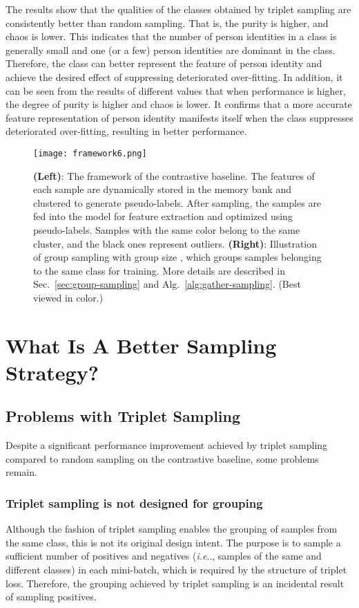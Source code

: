 \documentclass[lettersize,journal]{IEEEtran}
\makeatletter
\DeclareRobustCommand\onedot{\futurelet\@let@token\@onedot}
\def\@onedot{\ifx\@let@token.\else.\null\fi\xspace}
\def\ie{\emph{i.e}\onedot} \def\Ie{\emph{I.e}\onedot}
\makeatother
\begin{document}
The results show that the qualities of the classes obtained by triplet sampling are consistently better than random sampling. That is, the purity is higher, and chaos is lower. This indicates that the number of person identities in a class is generally small and one (or a few) person identities are dominant in the class. Therefore, the class can better represent the feature of person identity and achieve the desired effect of suppressing deteriorated over-fitting. In addition, it can be seen from the results of different  values that when performance is higher, the degree of purity is higher and chaos is lower. It confirms that a more accurate feature representation of person identity manifests itself when the class suppresses deteriorated over-fitting, resulting in better performance.

\begin{figure*}[t]
\begin{center}
\texttt{[image: framework6.png]}
\end{center}
\caption{\textbf{(Left)}: The framework of the contrastive baseline. The features of each sample are dynamically stored in the memory bank and clustered to generate pseudo-labels. After sampling, the samples are fed into the model for feature extraction and optimized using pseudo-labels. Samples with the same color belong to the same cluster, and the black ones represent outliers.
\textbf{(Right)}: Illustration of group sampling with group size , which groups samples belonging to the same class for training. More details are described in Sec.~\ref{sec:group-sampling} and Alg.~\ref{alg:gather-sampling}. (Best viewed in color.)}
\label{fig:framework}
\end{figure*}

\section{What Is A Better Sampling Strategy? }
\label{sec:what-is-a-better-sampling}

\subsection{Problems with Triplet Sampling}
\label{sec:shortcomings}
Despite a significant performance improvement achieved by triplet sampling compared to random sampling on the contrastive baseline, some problems remain.

\subsubsection{Triplet sampling is not designed for grouping}
Although the  fashion of triplet sampling enables the grouping of samples from the same class, this is not its original design intent. The purpose is to sample a sufficient number of positives and negatives (\ie, samples of the same and different classes) in each mini-batch, which is required by the structure of triplet loss. Therefore, the grouping achieved by triplet sampling is an incidental result of sampling positives.
\end{document}
